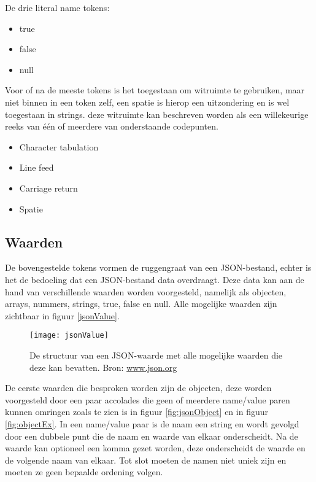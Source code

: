 De drie literal name tokens:

\begin{itemize}
    \item true  
    \item false     
    \item null      
\end{itemize}

Voor of na de meeste tokens is het toegestaan om witruimte te gebruiken, maar niet binnen in een token zelf, een spatie is hierop een uitzondering en is wel toegestaan in strings. deze witruimte kan beschreven worden als een willekeurige reeks van één of meerdere van onderstaande codepunten.

\begin{itemize}
    \item Character tabulation       
    \item Line feed       
    \item Carriage return   
    \item Spatie           
\end{itemize}


\subsection{Waarden}
\label{subsec:Waarden}

De bovengestelde tokens vormen de ruggengraat van een JSON-bestand, echter is het de bedoeling dat een JSON-bestand data overdraagt. Deze data kan aan de hand van verschillende waarden worden voorgesteld, namelijk als objecten, arrays, nummers, strings, true, false en null. Alle mogelijke waarden zijn zichtbaar in figuur \ref{jsonValue}.

\begin{figure}[ht]
    \centering
    \texttt{[image: jsonValue]}
   \caption[JSON values]{De structuur van een JSON-waarde met alle mogelijke waarden die deze kan bevatten. Bron: \url{www.json.org}}
   \label{fig:jsonValue}
\end{figure}

De eerste waarden die besproken worden zijn de objecten, deze worden voorgesteld door een paar accolades die geen of meerdere name/value paren kunnen omringen zoals te zien is in figuur \ref{fig:jsonObject} en in figuur \ref{fig:objectEx}. In een name/value paar is de naam een string en wordt gevolgd door een dubbele punt die de naam en waarde van elkaar onderscheidt. 
Na de waarde kan optioneel een komma gezet worden, deze onderscheidt de waarde en de volgende naam van elkaar. Tot slot moeten de namen niet uniek zijn en moeten ze geen bepaalde ordening volgen.

